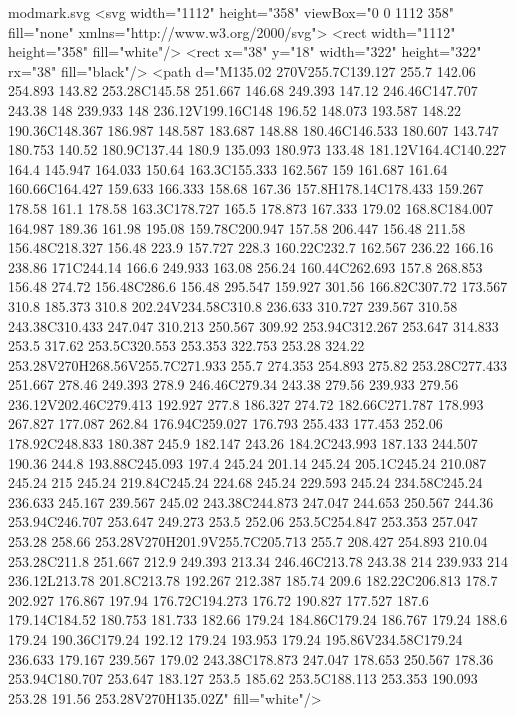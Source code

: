 \begin{filecontents}[noheader]{modmark.svg}
	<svg width="1112" height="358" viewBox="0 0 1112 358" fill="none" xmlns="http://www.w3.org/2000/svg">
	<rect width="1112" height="358" fill="white"/>
	<rect x="38" y="18" width="322" height="322" rx="38" fill="black"/>
	<path d="M135.02 270V255.7C139.127 255.7 142.06 254.893 143.82 253.28C145.58 251.667 146.68 249.393 147.12 246.46C147.707 243.38 148 239.933 148 236.12V199.16C148 196.52 148.073 193.587 148.22 190.36C148.367 186.987 148.587 183.687 148.88 180.46C146.533 180.607 143.747 180.753 140.52 180.9C137.44 180.9 135.093 180.973 133.48 181.12V164.4C140.227 164.4 145.947 164.033 150.64 163.3C155.333 162.567 159 161.687 161.64 160.66C164.427 159.633 166.333 158.68 167.36 157.8H178.14C178.433 159.267 178.58 161.1 178.58 163.3C178.727 165.5 178.873 167.333 179.02 168.8C184.007 164.987 189.36 161.98 195.08 159.78C200.947 157.58 206.447 156.48 211.58 156.48C218.327 156.48 223.9 157.727 228.3 160.22C232.7 162.567 236.22 166.16 238.86 171C244.14 166.6 249.933 163.08 256.24 160.44C262.693 157.8 268.853 156.48 274.72 156.48C286.6 156.48 295.547 159.927 301.56 166.82C307.72 173.567 310.8 185.373 310.8 202.24V234.58C310.8 236.633 310.727 239.567 310.58 243.38C310.433 247.047 310.213 250.567 309.92 253.94C312.267 253.647 314.833 253.5 317.62 253.5C320.553 253.353 322.753 253.28 324.22 253.28V270H268.56V255.7C271.933 255.7 274.353 254.893 275.82 253.28C277.433 251.667 278.46 249.393 278.9 246.46C279.34 243.38 279.56 239.933 279.56 236.12V202.46C279.413 192.927 277.8 186.327 274.72 182.66C271.787 178.993 267.827 177.087 262.84 176.94C259.027 176.793 255.433 177.453 252.06 178.92C248.833 180.387 245.9 182.147 243.26 184.2C243.993 187.133 244.507 190.36 244.8 193.88C245.093 197.4 245.24 201.14 245.24 205.1C245.24 210.087 245.24 215 245.24 219.84C245.24 224.68 245.24 229.593 245.24 234.58C245.24 236.633 245.167 239.567 245.02 243.38C244.873 247.047 244.653 250.567 244.36 253.94C246.707 253.647 249.273 253.5 252.06 253.5C254.847 253.353 257.047 253.28 258.66 253.28V270H201.9V255.7C205.713 255.7 208.427 254.893 210.04 253.28C211.8 251.667 212.9 249.393 213.34 246.46C213.78 243.38 214 239.933 214 236.12L213.78 201.8C213.78 192.267 212.387 185.74 209.6 182.22C206.813 178.7 202.927 176.867 197.94 176.72C194.273 176.72 190.827 177.527 187.6 179.14C184.52 180.753 181.733 182.66 179.24 184.86C179.24 186.767 179.24 188.6 179.24 190.36C179.24 192.12 179.24 193.953 179.24 195.86V234.58C179.24 236.633 179.167 239.567 179.02 243.38C178.873 247.047 178.653 250.567 178.36 253.94C180.707 253.647 183.127 253.5 185.62 253.5C188.113 253.353 190.093 253.28 191.56 253.28V270H135.02Z" fill="white"/>

\end{filecontents}
